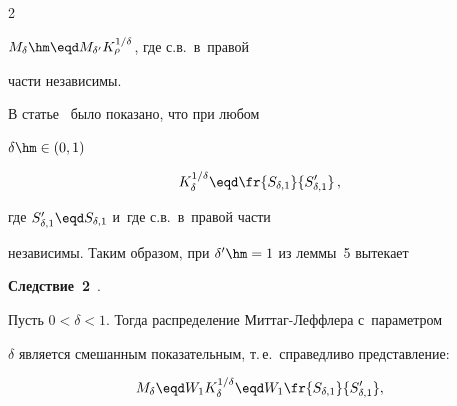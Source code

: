 \begin{multicols}{2}
{$M_{\delta}\hm\eqd M_{\delta'}K_{\rho}^{1/\delta}$, где с.в.\ в~правой


части независимы.}





\smallskip





В статье~\cite{KorolevZeifmanKMJ} было показано, что при любом


$\delta\hm\in(0,1)$





\noindent


\begin{equation}


K_{\delta}^{1/\delta}\eqd


\fr{S_{\delta,1}}{S'_{\delta,1}}\,,\label{e11-kgz}


\end{equation}





\vspace*{-1pt}





\noindent


где $S'_{\delta,1}\eqd S_{\delta,1}$ и~где с.в.\ в~правой части


независимы. Таким образом, при $\delta'\hm=1$ из леммы~5 вытекает





\smallskip





\noindent


\textbf{Следствие~2}~\cite{Kozubowski1998, KorolevZeifmanKMJ}. 


Пусть $0<\delta<1$. Тогда распределение Миттаг-Леффлера с~параметром


$\delta$ является смешанным показательным, т.\,е.\ справедливо представление:





\noindent


$$


M_{\delta}\eqd W_1 K_{\delta}^{1/\delta}\eqd


W_1 \fr{S_{\delta,1}}{S'_{\delta,1}},


$$






\end{multicols}
